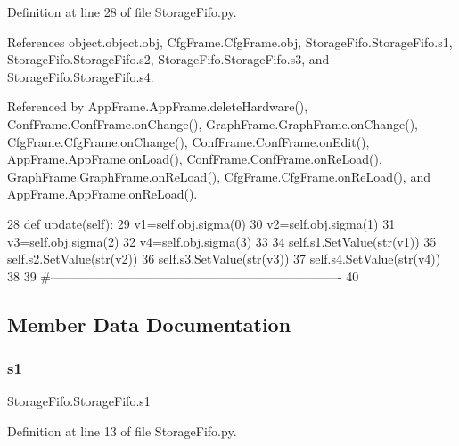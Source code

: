 Definition at line 28 of file Storage\+Fifo.\+py.



References object.\+object.\+obj, Cfg\+Frame.\+Cfg\+Frame.\+obj, Storage\+Fifo.\+Storage\+Fifo.\+s1, Storage\+Fifo.\+Storage\+Fifo.\+s2, Storage\+Fifo.\+Storage\+Fifo.\+s3, and Storage\+Fifo.\+Storage\+Fifo.\+s4.



Referenced by App\+Frame.\+App\+Frame.\+delete\+Hardware(), Conf\+Frame.\+Conf\+Frame.\+on\+Change(), Graph\+Frame.\+Graph\+Frame.\+on\+Change(), Cfg\+Frame.\+Cfg\+Frame.\+on\+Change(), Conf\+Frame.\+Conf\+Frame.\+on\+Edit(), App\+Frame.\+App\+Frame.\+on\+Load(), Conf\+Frame.\+Conf\+Frame.\+on\+Re\+Load(), Graph\+Frame.\+Graph\+Frame.\+on\+Re\+Load(), Cfg\+Frame.\+Cfg\+Frame.\+on\+Re\+Load(), and App\+Frame.\+App\+Frame.\+on\+Re\+Load().


\begin{DoxyCode}
28     \textcolor{keyword}{def }update(self):
29         v1=self.obj.sigma(0)
30         v2=self.obj.sigma(1)
31         v3=self.obj.sigma(2)
32         v4=self.obj.sigma(3)
33 
34         self.s1.SetValue(str(v1))
35         self.s2.SetValue(str(v2))
36         self.s3.SetValue(str(v3))
37         self.s4.SetValue(str(v4))        
38 
39 \textcolor{comment}{#----------------------------------------------------------------------}
40 
\end{DoxyCode}


\subsection{Member Data Documentation}
\mbox{\label{classStorageFifo_1_1StorageFifo_af5f69dc80cba7f4f1a2407d365d71b13}} 
\subsubsection{\texorpdfstring{s1}{s1}}
{\footnotesize\ttfamily Storage\+Fifo.\+Storage\+Fifo.\+s1}



Definition at line 13 of file Storage\+Fifo.\+py.



